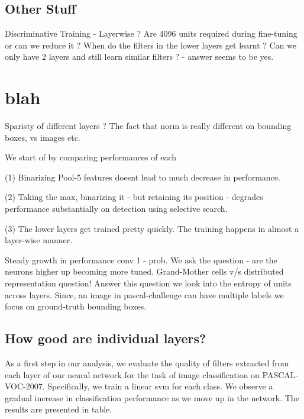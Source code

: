\documentclass[runningheads]{llncs}
\begin{document}
\subsection {Other Stuff}
Discriminative Training - Layerwise ?
Are 4096 units required during fine-tuning or can we reduce it ?
When do the filters in the lower layers get learnt ?
Can we only have 2 layers and still learn similar filters ? - answer seems to be yes.



\section{blah}

Sparisty of different layers ? The fact that norm is really different on bounding boxes, vs images etc.

We start of by comparing performances of each 

(1) Binarizing Pool-5 features doesnt lead to much decrease in performance.

(2) Taking the max, binarizing it - but retaining its position - degrades performance substantially on detection using selective search. 

(3) The lower layers get trained pretty quickly. The training happens in almost a layer-wise manner. 


Steady growth in performance conv 1 - prob. 
We ask the question - are the neurons higher up becoming more tuned. Grand-Mother cells v/s distributed representation question! Answer this question we look into the entropy of units across layers. Since, an image in pascal-challenge can have multiple labels we focus on ground-truth bounding boxes.


\subsection{How good are individual layers?}
As a first step in our analysis, we evaluate the quality of filters extracted from each layer of our neural network for the task of image classification on PASCAL-VOC-2007. Specifically, we train a linear svm for each class. We observe a gradual increase in classification performance as we move up in the network. The results are presented in table. 
\end{document}
